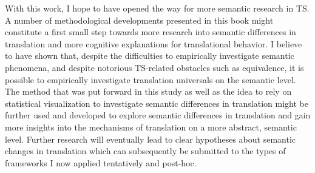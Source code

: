 With this work, I hope to have opened the way for more semantic research in TS. A number of methodological developments presented in this book might constitute a first small step towards more research into semantic differences in translation and more cognitive explanations for translational behavior. I believe to have shown that, despite the difficulties to empirically investigate semantic phenomena, and despite notorious TS-related obstacles such as equivalence, it is possible to empirically investigate translation universals on the semantic level. The method that was put forward in this study as well as the idea to rely on statistical visualization to investigate semantic differences in translation might be further used and developed to explore semantic differences in translation and gain more insights into the mechanisms of translation on a more abstract, semantic level. Further research will eventually lead to clear hypotheses about semantic changes in translation which can subsequently be submitted to the types of frameworks I now applied tentatively and post-hoc.
